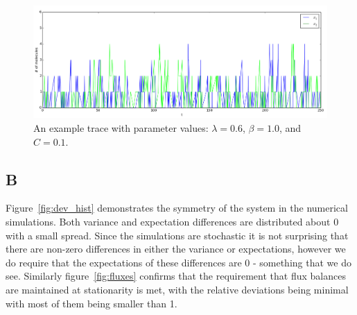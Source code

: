 \documentclass[a4paper,12pt]{article}
\begin{document}
\begin{figure}[!ht]
\centering
        \includegraphics[scale=0.45]{images/trace}
                \caption{An example trace with parameter values: $\lambda=0.6$, $\beta=1.0$, and $C=0.1$.}
                \label{fig:trace}
                
\end{figure}
        
\subsection*{B}
Figure~\ref{fig:dev_hist} demonstrates the symmetry of the system in the numerical simulations. Both variance and expectation differences are distributed about 0 with a small spread. Since the simulations are stochastic it is not surprising that there are non-zero differences in either the variance or expectations, however we do require that the expectations of these differences are 0  - something that we do see. Similarly figure~\ref{fig:fluxes} confirms that the requirement that flux balances are maintained at stationarity is met, with the relative deviations being minimal with most of them being smaller than 1.

\end{document}
